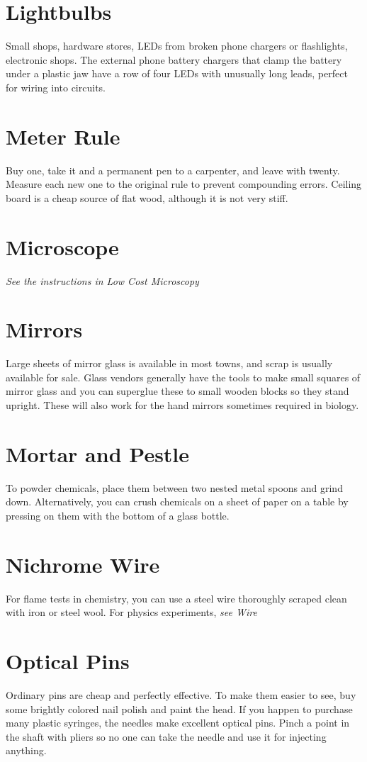 \section{Lightbulbs}
Small shops, 
hardware stores, 
LEDs from broken phone chargers or flashlights, 
electronic shops. 
The external phone battery chargers that clamp the battery 
under a plastic jaw have a row of four LEDs with unusually long leads, 
perfect for wiring into circuits.

\section{Meter Rule}
Buy one, 
take it and a permanent pen to a carpenter, 
and leave with twenty. 
Measure each new one to the original rule to prevent compounding errors. 
Ceiling board is a cheap source of flat wood, 
although it is not very stiff.

\section{Microscope}
\textit{See the instructions in Low Cost Microscopy}

\section{Mirrors}
Large sheets of mirror glass is available in most towns, 
and scrap is usually available for sale. 
Glass vendors generally have the tools 
to make small squares of mirror glass 
and you can superglue these to small wooden blocks so they stand upright. 
These will also work for the hand mirrors sometimes required in biology.

\section {Mortar and Pestle}
To powder chemicals, 
place them between two nested metal spoons and grind down. 
Alternatively, 
you can crush chemicals on a sheet of paper on a table 
by pressing on them with the bottom of a glass bottle.

\section{Nichrome Wire}
For flame tests in chemistry, 
you can use a steel wire thoroughly scraped clean with iron or steel wool. 
For physics experiments, 
\textit{see Wire}

\section{Optical Pins}
Ordinary pins are cheap and perfectly effective. 
To make them easier to see, 
buy some brightly colored nail polish and paint the head. 
If you happen to purchase many plastic syringes, 
the needles make excellent optical pins. 
Pinch a point in the shaft with pliers so no one can take the needle 
and use it for injecting anything.

